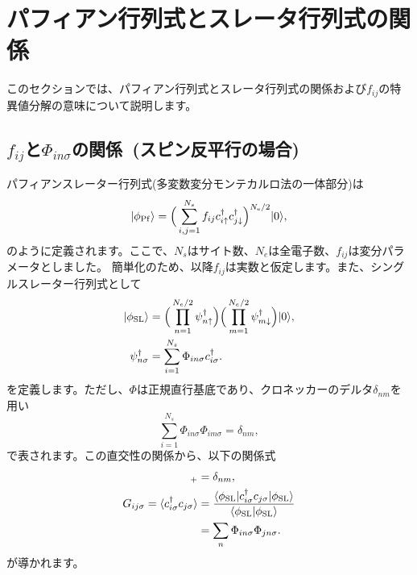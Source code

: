 \section{{パフィアン行列式とスレータ行列式の関係}}
\label{sec:PuffAndSlater}
このセクションでは、パフィアン行列式とスレータ行列式の関係および$f_{ij}$の特異値分解の意味について説明します。
\subsection{$f_{ij}$と$\Phi_{in\sigma}$の関係~(スピン反平行の場合)}
パフィアンスレーター行列式(多変数変分モンテカルロ法の一体部分)は
\begin{equation}
|\phi_{\rm Pf}\rangle=\Big(\sum_{i,j=1}^{N_{s}}f_{ij}c_{i\uparrow}^{\dagger}c_{j\downarrow}^{\dagger}\Big)^{N_{\rm e}/2}|0\rangle,
\end{equation}
のように定義されます。ここで、$N_{s}$はサイト数、$N_{e}$は全電子数、$f_{ij}$は変分パラメータとしました。
簡単化のため、以降$f_{ij}$は実数と仮定します。また、シングルスレーター行列式として
\begin{align}
|\phi_{\rm SL}\rangle&=\Big(\prod_{n=1}^{N_{e}/2}\psi_{n\uparrow}^{\dagger}\Big)
\Big(\prod_{m=1}^{N_{e}/2}\psi_{m\downarrow}^{\dagger}\Big)|0\rangle, \\
\psi_{n\sigma}^{\dagger}&=\sum_{i=1}^{N_{s}}\Phi_{in\sigma}c^{\dagger}_{i\sigma}.
\end{align}
を定義します。ただし、$\Phi$は正規直行基底であり、クロネッカーのデルタ$\delta_{nm}$を用い
\begin{equation}
\sum_{i=1}^{N_{s}}\Phi_{in\sigma}\Phi_{im\sigma}=\delta_{nm},
\end{equation}
で表されます。この直交性の関係から、以下の関係式
\begin{align}
[\psi^{\dagger}_{n\sigma},\psi_{m\sigma}]_{+}&=\delta_{nm},\\
G_{ij\sigma}=\langle c_{i\sigma}^{\dagger}c_{j\sigma}\rangle 
&=\frac{\langle \phi_{\rm SL}| c_{i\sigma}^{\dagger}c_{j\sigma} | \phi_{\rm SL}\rangle}{\langle \phi_{\rm SL}|\phi_{\rm SL}\rangle } \\
&=\sum_{n} \Phi_{in\sigma} \Phi_{jn\sigma}.
\end{align}
が導かれます。

